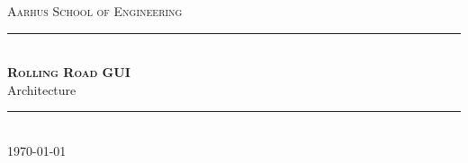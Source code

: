 \newcommand{\HRule}{\rule{\linewidth}{0.1mm}} %

\thispagestyle{empty}

\begin{center}
	
	\textsc{\LARGE Aarhus School of Engineering}\\[1.5cm] %
	
	\HRule \\[0.8cm]
	{\huge \bfseries \textsc{Rolling Road GUI}} \\[0.5cm]{\LARGE Architecture} \\[0.4cm]
	\HRule \\[1.5cm]
	
	\vfill
	\textsc{\large \today}\\
	
\end{center} %

\newpage